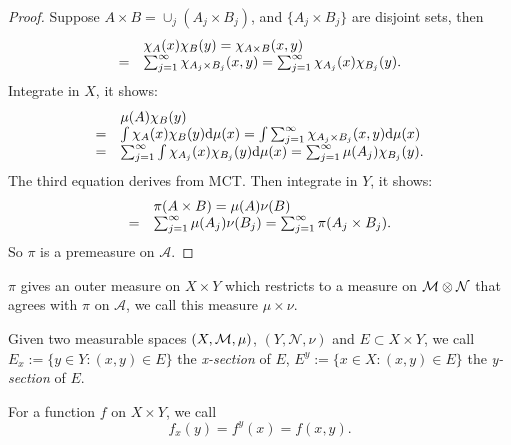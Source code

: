 \begin{proof}
    Suppose $A\times B=\cup_{j}(A_j\times B_{j})$, and 
    $\{A_{j}\times B_{j}\}$ are disjoint sets, then 
    \begin{displaymath}
        \begin{array}{rl}
        &\chi_{A}(x)\chi_{B}(y)=\chi_{A\times B}(x,y)\\
        =&\sum_{j=1}^{\infty}\chi_{A_j\times B_j}(x,y)
        =\sum_{j=1}^{\infty}\chi_{A_j}(x)\chi_{B_j}(y).\\
        \end{array}
    \end{displaymath}
    Integrate in $X$, it shows:
    \begin{displaymath}
        \begin{array}{rl}
            &\mu(A)\chi_{B}(y)\\
            =&\int\chi_{A}(x)\chi_{B}(y)\mathrm{d}\mu(x)
            =\int\sum_{j=1}^{\infty}\chi_{A_j\times B_j}(x,y)\mathrm{d}\mu(x)\\
            =&\sum_{j=1}^{\infty}\int\chi_{A_j}(x)\chi_{B_j}(y)\mathrm{d}\mu(x)
            =\sum_{j=1}^{\infty}\mu(A_j)\chi_{B_j}(y).
        \end{array}
    \end{displaymath}
    The third equation derives from MCT. 
    Then integrate in $Y$, it shows:
    \begin{displaymath}
        \begin{array}{rl}
            &\pi(A\times B)=\mu(A)\nu(B)\\
            =&\sum_{j=1}^{\infty}\mu(A_j)\nu(B_j)
            =\sum_{j=1}^{\infty}\pi(A_j\times B_j).
        \end{array}
    \end{displaymath}
    So $\pi$ is a premeasure on $\mathcal{A}$.
\end{proof}
\begin{defn}
    \label{Defn:ProductMeas}
    $\pi$ gives an outer measure on $X\times Y$ which restricts 
    to a measure on $\mathcal{M}\otimes \mathcal{N}$ that agrees with 
    $\pi$ on $\mathcal{A}$, we call this measure $\mu\times\nu$.
\end{defn}
\begin{defn}
    Given two measurable spaces $(X,\mathcal{M},\mu)$, $(Y,\mathcal{N},\nu)$ 
    and $E\subset X\times Y$, we call 
    $E_x:=\{y\in Y:(x,y)\in E\}$ the \textit{x-section} of $E$, 
    $E^{y}:=\{x\in X:(x,y)\in E\}$ the \textit{y-section} of $E$.  
\end{defn}
\begin{ntn}
    For a function $f$ on $X\times Y$, we call 
    \begin{displaymath}
        f_{x}(y)=f^{y}(x)=f(x,y).
    \end{displaymath}
\end{ntn}
